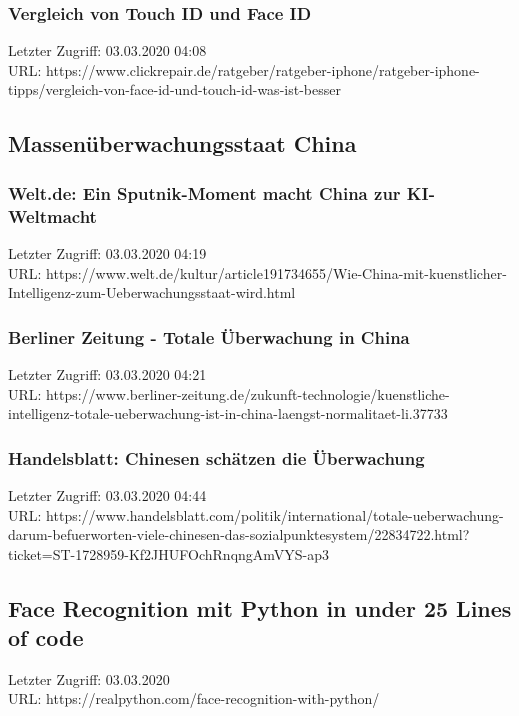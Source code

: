 	\subsubsection{Vergleich von Touch ID und Face ID}
	\label{cickrepair:touch_id_vs_face_id}
		Letzter Zugriff: 03.03.2020 04:08\\
		URL: https://www.clickrepair.de/ratgeber/ratgeber-iphone/ratgeber-iphone-tipps/vergleich-von-face-id-und-touch-id-was-ist-besser

\subsection{Massenüberwachungsstaat China}
	\subsubsection{Welt.de: Ein Sputnik-Moment macht China zur KI-Weltmacht}
	\label{welt:China_ki_weltmacht}
		Letzter Zugriff: 03.03.2020 04:19\\
		URL: https://www.welt.de/kultur/article191734655/Wie-China-mit-kuenstlicher-Intelligenz-zum-Ueberwachungsstaat-wird.html

	\subsubsection{Berliner Zeitung - Totale Überwachung in China}
	\label{berlinerZeitung:totale_ueberwachung_in_china}
		Letzter Zugriff: 03.03.2020 04:21\\
		URL: https://www.berliner-zeitung.de/zukunft-technologie/kuenstliche-intelligenz-totale-ueberwachung-ist-in-china-laengst-normalitaet-li.37733

	\subsubsection{Handelsblatt: Chinesen schätzen die Überwachung}
	\label{handelsblatt:chinesen_schaetzen_die_ueberwachung}
		Letzter Zugriff: 03.03.2020 04:44\\
		URL: https://www.handelsblatt.com/politik/international/totale-ueberwachung-darum-befuerworten-viele-chinesen-das-sozialpunktesystem/22834722.html?ticket=ST-1728959-Kf2JHUFOchRnqngAmVYS-ap3

\subsection{Face Recognition mit Python in under 25 Lines of code}
\label{realpython:face_recognition_in_under_25_lines_of_code}
	Letzter Zugriff: 03.03.2020\\
	URL: https://realpython.com/face-recognition-with-python/

